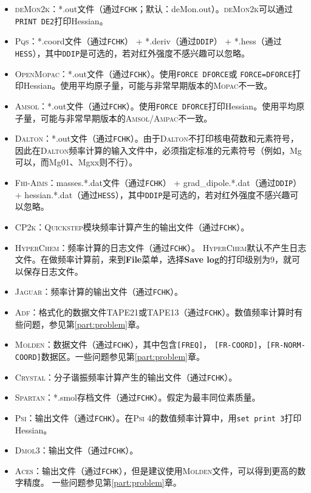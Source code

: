 \documentclass[12pt,a4paper,openany,twoside,cap,UTF8]{ctexbook}
\begin{document}
\begin{itemize}
\item \textsc{deMon2k}：*.out文件（通过\verb|FCHK|；默认：deMon.out）。\textsc{deMon2k}可以通过\texttt{PRINT DE2}打印Hessian。
\item \textsc{Pqs}：*.coord文件（通过\verb|FCHK|） + *.deriv（通过\verb|DDIP|） + *.hess（通过\verb|HESS|），其中\verb|DDIP|是可选的，若对红外强度不感兴趣可以忽略。
\item \textsc{OpenMopac}：*.out文件（通过\verb|FCHK|）。使用\texttt{FORCE DFORCE}或
\texttt{FORCE=DFORCE}打印Hessian。使用平均原子量，可能与非常早期版本的\textsc{Mopac}不一致。
\item \textsc{Amsol}：*.out文件（通过\verb|FCHK|）。使用\texttt{FORCE DFORCE}打印Hessian。使用平均原子量，可能与非常早期版本的\textsc{Amsol/Ampac}不一致。
\item \textsc{Dalton}：*.out文件（通过\verb|FCHK|）。由于\textsc{Dalton}不打印核电荷数和元素符号，因此在\textsc{Dalton}频率计算的输入文件中，必须指定标准的元素符号（例如，Mg可以，而Mg01、Mgxx则不行）。
\item \textsc{Fhi-Aims}：masses.*.dat文件（通过\verb|FCHK|） + grad{\_}dipole.*.dat（通过\verb|DDIP|） + hessian.*.dat（通过\verb|HESS|），其中\verb|DDIP|是可选的，若对红外强度不感兴趣可以忽略。
\item \textsc{CP2k}：\textsc{Quickstep}模块频率计算产生的输出文件（通过\verb|FCHK|）。
\item \textsc{HyperChem}：频率计算的日志文件（通过\verb|FCHK|）。
\textsc{HyperChem}默认不产生日志文件。在做频率计算前，来到\textbf{File}菜单，选择\textbf{Save log}的打印级别为9，就可以保存日志文件。
\item \textsc{Jaguar}：频率计算的输出文件（通过\verb|FCHK|）。
\item \textsc{Adf}：格式化的数据文件TAPE21或TAPE13（通过\verb|FCHK|）。数值频率计算时有些问题，参见第\ref{part:problem}章。
\item \textsc{Molden}：数据文件（通过\verb|FCHK|），其中包含\verb|[FREQ]|，
\verb|[FR-COORD]|，\verb|[FR-NORM-COORD]|数据区。一些问题参见第\ref{part:problem}章。
\item \textsc{Crystal}：分子谐振频率计算产生的输出文件（通过\verb|FCHK|）。
\item \textsc{Spartan}：*.smol存档文件（通过\verb|FCHK|）。假定为最丰同位素质量。
\item \textsc{Psi}：输出文件（通过\verb|FCHK|）。在\textsc{Psi} 4的数值频率计算中，用\texttt{set print 3}打印Hessian。
\item \textsc{Dmol3}：输出文件（通过\verb|FCHK|）。
\item \textsc{Aces}：输出文件（通过\verb|FCHK|），但是建议使用\textsc{Molden}文件，可以得到更高的数字精度。 一些问题参见第\ref{part:problem}章。

\end{itemize}
\end{document}
